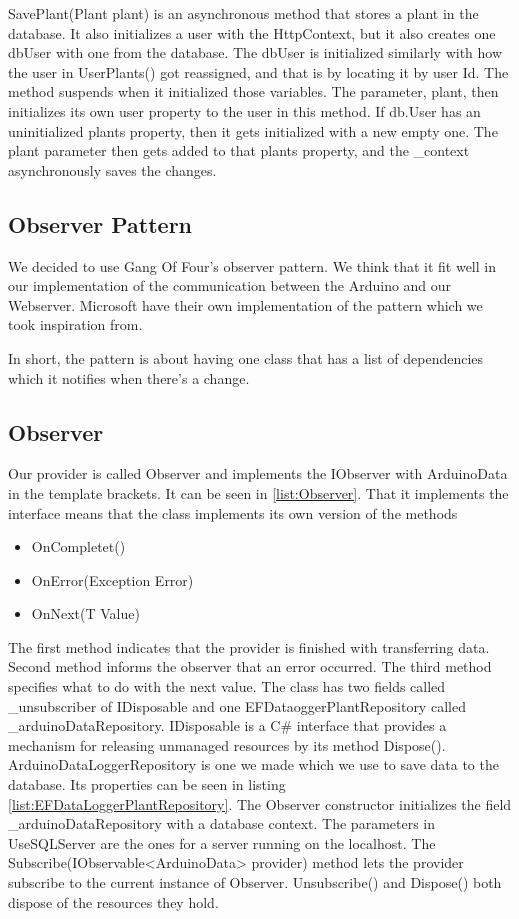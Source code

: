 \documentclass[a4paper,12pt,twoside,openright,titlepage]{book}
\begin{document}
SavePlant(Plant plant) is an asynchronous method that stores a plant in the database.  It also initializes a user with the HttpContext, but it also creates one dbUser with one from the database. The dbUser is initialized similarly with how the user in UserPlants() got reassigned, and that is by locating it by user Id. The method suspends when it initialized those variables. The parameter, plant, then initializes its own user property to the user in this method. If db.User has an uninitialized plants property, then it gets initialized with a new empty one. The plant parameter then gets added to that plants property, and the \_context asynchronously saves the changes.
  
\subsection{Observer Pattern}
We decided to use Gang Of Four's observer pattern\cite{GoF}. We think that it fit well in our implementation of the communication between the Arduino and our Webserver. Microsoft have their own implementation of the pattern\cite{MicrosoftObserver} which we took inspiration from.
 
In short, the pattern is about having one class that has a list of dependencies which it notifies when there's a change.

\subsection{Observer}
Our provider is called Observer and implements the IObserver with ArduinoData in the template brackets. It can be seen in \ref{list:Observer}. That it implements the interface means that the class implements its own version of the methods
\begin{itemize}
\item OnCompletet()
\item OnError(Exception Error)
\item OnNext(T Value)
\end{itemize}

The first method indicates that the provider is finished with transferring data. Second method informs the observer that an error occurred. The third method specifies what to do with the next value.
The class has two fields called \_unsubscriber of IDisposable and one EFDataoggerPlantRepository called \_arduinoDataRepository. IDisposable is a C\# interface that provides a mechanism for releasing unmanaged resources by its method Dispose(). ArduinoDataLoggerRepository is one we made which we use to save data to the database. Its properties can be seen in listing \ref{list:EFDataLoggerPlantRepository}. The Observer constructor initializes the field \_arduinoDataRepository with a database context. The parameters in UseSQLServer are the ones for a server running on the localhost. The Subscribe(IObservable<ArduinoData> provider) method lets the provider subscribe to the current instance of Observer. Unsubscribe() and Dispose() both dispose of the resources they hold. 
\end{document}
